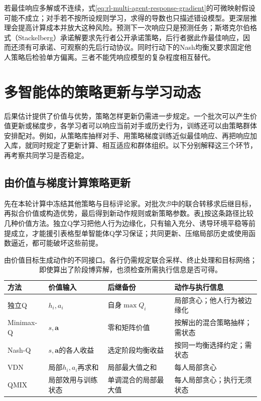 若最佳响应多解或不连续，式\eqref{eq:rl-multi-agent-response-gradient}的可微映射假设可能不成立；对手若不按所设规则学习，求得的导数也只描述错设模型。更深层推理会提高计算成本并放大这种风险。预测下一次响应只是预测任务；斯塔克尔伯格式（Stackelberg）承诺解要求先行者公开承诺策略，后行者据此作最佳响应，因而还须有可承诺、可观察的先后行动协议。同时行动下的Nash均衡又要求固定他人策略后检验单方偏离。三者不能凭响应模型的复杂程度相互替代。

\section{多智能体的策略更新与学习动态}
\label{sec:rl-multi-agent-learning}

后果估计提供了价值与优势，策略怎样更新仍需进一步规定。一个批次可以产生价值更新或梯度步，各学习者可以响应当前对手或历史行为，训练还可以由策略群体安排配对。例如，从策略库抽样对手、用策略梯度训练近似最佳响应、再把响应加入库，就同时规定了更新计算、相互适应和群体组织。以下分别解释这三个环节，再考察共同学习是否稳定。

\subsection{由价值与梯度计算策略更新}
\label{sec:rl-multi-agent-update}

先在本轮计算中冻结其他策略与目标评论家。对批次$\mathcal B$中的联合转移求后继目标，再拟合价值或构造优势，最后得到新动作规则或新策略参数。表\ref{tab:rl-multi-agent-value-updates}按这条路径比较几种价值方法。独立Q学习把他人行为边缘化，只有输入充分、诱导环境平稳等前提成立，才能援引表格型单智能体Q学习保证；共同更新、压缩局部历史或使用函数逼近，都可能破坏这些前提。

\begin{table}[htbp]
 \centering
 \begin{tabularx}{\linewidth}{@{}l >{\raggedright\arraybackslash}X >{\raggedright\arraybackslash}X >{\raggedright\arraybackslash}X@{}}
 \toprule
 方法 & 价值输入 & 后继备份 & 动作与执行信息\\
 \midrule
 独立Q & $h_i,a_i$ & 自身$\max Q_i$ & 局部贪心；他人行为被边缘化\\
 Minimax-Q & $s,\bm a$ & 零和矩阵价值 & 按解出的混合策略抽样；需状态\\
 Nash-Q & $s,\bm a$的各人收益 & 选定阶段均衡收益 & 按同一均衡选择约定；需状态\\
 VDN & 局部$h_i,a_i$再求和 & 局部最大值之和 & 每人局部贪心\\
 QMIX & 局部效用与训练状态 & 单调混合的局部最大值 & 每人局部贪心；执行无须状态\\
 \bottomrule
 \end{tabularx}
 \caption{由价值目标生成动作的不同接口。各行仍需规定联合采样、终止处理和目标网络；即使算出了阶段博弈解，也须检查所需执行信息是否可得。}
 \label{tab:rl-multi-agent-value-updates}
\end{table}

